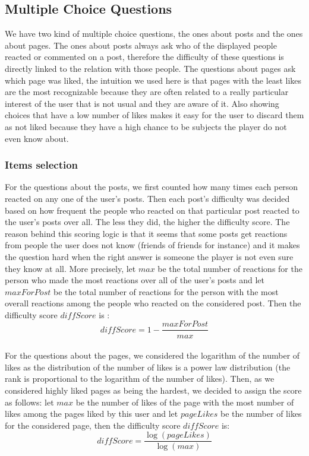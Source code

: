 \subsection{Multiple Choice Questions}
We have two kind of multiple choice questions, the ones about posts and the ones about pages. The ones about posts always ask who of the displayed people reacted or commented on a post, therefore the difficulty of these questions is directly linked to the relation with those people. The questions about pages ask which page was liked, the intuition we used here is that pages with the least likes are the most recognizable because they are often related to a really particular interest of the user that is not usual and they are aware of it. Also showing choices that have a low number of likes makes it easy for the user to discard them as not liked because they have a high chance to be subjects the player do not even know about.
\subsubsection{Items selection}
For the questions about the posts, we first counted how many times each person reacted on any one of the user's posts. Then each post's difficulty was decided based on how frequent the people who reacted on that particular post reacted to the user's posts over all. The less they did, the higher the difficulty score. The reason behind this scoring logic is that it seems that some posts get reactions from people the user does not know (friends of friends for instance) and it makes the question hard when the right answer is someone the player is not even sure they know at all. More precisely, let $\mathit{max}$ be the total number of reactions for the person who made the most reactions over all of the user's posts and let $\mathit{maxForPost}$ be the total number of reactions for the person with the most overall reactions among the people who reacted on the considered post. Then the difficulty score $\mathit{diffScore}$ is : $$\mathit{diffScore} = 1 - \frac{\mathit{maxForPost}}{\mathit{max}}$$\\
For the questions about the pages, we considered the logarithm of the number of likes as the distribution of the number of likes is a power law distribution (the rank is proportional to the logarithm of the number of likes). Then, as we considered highly liked pages as being the hardest, we decided to assign the score as follows: let $\mathit{max}$ be the number of likes of the page with the most number of likes among the pages liked by this user and let $\mathit{pageLikes}$ be the number of likes for the considered page, then the difficulty score $\mathit{diffScore}$ is: $$\mathit{diffScore} = \frac{\log(\mathit{pageLikes})}{\log(\mathit{max})}$$
